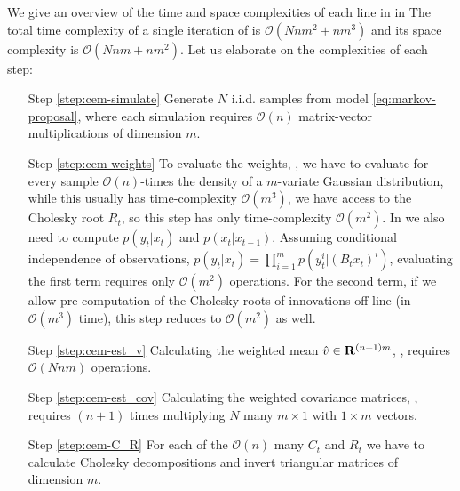We give an overview of the time and space complexities of each line in  in 
The total time complexity of a single iteration of  is $\mathcal O \left( Nnm^{2} + nm^{3}\right)$ and its space complexity is $\mathcal O \left( Nnm + nm^{2}\right)$. Let us elaborate on the complexities of each step:
\begin{enumerate}
    \item[Step \ref{step:cem-simulate}] Generate $N$ i.i.d. samples from model \eqref{eq:markov-proposal}, where each simulation requires $\mathcal O(n)$ matrix-vector multiplications of dimension $m$. 
    \item[Step \ref{step:cem-weights}] To evaluate the weights, , we have to evaluate for every sample $\mathcal O(n)$-times the density of a $m$-variate Gaussian distribution, while this usually has time-complexity $\mathcal O(m^{3})$, we have access to the Cholesky root $R_{t}$, so this step has only time-complexity $\mathcal O(m^{2})$. In  we also need to compute $p(y_{t}|x_{t})$ and $p(x_{t}|x_{t - 1})$. Assuming conditional independence of observations, $p(y_{t}|x_{t}) = \prod_{i = 1}^{m}p(y_{t}^i|(B_{t}x_{t})^{i})$, evaluating the first term requires only $\mathcal O(m^{2})$ operations. For the second term, if we allow pre-computation of the Cholesky roots of innovations off-line (in $\mathcal O(m^{3})$ time), this step reduces to $\mathcal O(m^{2})$ as well.  
    \item[Step \ref{step:cem-est_v}] Calculating the weighted mean $\hat v \in\mathbf R^{(n+1)m}$, , requires $\mathcal O(Nnm)$ operations.
    \item[Step \ref{step:cem-est_cov}] Calculating the weighted covariance matrices, , requires $(n+1)$ times multiplying $N$ many $m\times 1$ with $1 \times m$ vectors. 
    \item[Step \ref{step:cem-C_R}] For each of the $\mathcal O(n)$ many $C_{t}$ and $R_{t}$ we have to calculate Cholesky decompositions and invert triangular matrices of dimension $m$. 
\end{enumerate}

